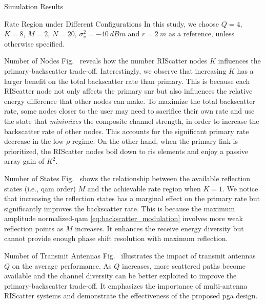 \begin{section}{Simulation Results}
\begin{subsection}{Rate Region under Different Configurations}
		In this study, we choose $Q=4$, $K=8$, $M=2$, $N=20$, $\sigma_v^2=\qty{-40}{dBm}$ and $r=\qty{2}{m}$ as a reference, unless otherwise specified.
		\begin{subsubsection}{Number of Nodes}
			Fig.~ reveals how the number RIScatter nodes $K$ influences the primary-backscatter trade-off.
			Interestingly, we observe that increasing $K$ has a larger benefit on the total backscatter rate than primary.
			This is because each RIScatter node not only affects the primary \gls{snr} but also influences the relative energy difference that other nodes can make.
			To maximize the total backscatter rate, some nodes closer to the user may need to sacrifice their own rate and use the state that \emph{minimizes} the composite channel strength, in order to increase the backscatter rate of other nodes.
			This accounts for the significant primary rate decrease in the low-$\rho$ regime.
			On the other hand, when the primary link is prioritized, the RIScatter nodes boil down to \gls{ris} elements and enjoy a passive array gain of $K^2$.
		\end{subsubsection}

		\begin{subsubsection}{Number of States}
			Fig.~ shows the relationship between the available reflection states (i.e., \gls{qam} order) $M$ and the achievable rate region when $K=1$.
			We notice that increasing the reflection states has a marginal effect on the primary rate but significantly improves the backscatter rate.
			This is because the maximum amplitude normalized-\gls{qam} \eqref{eq:backscatter_modulation} involves more weak reflection points as $M$ increases.
			It enhances the receive energy diversity but cannot provide enough phase shift resolution with maximum reflection.
		\end{subsubsection}

		\begin{subsubsection}{Number of Transmit Antennas}
			Fig.~ illustrates the impact of transmit antennas $Q$ on the average performance.
			As $Q$ increases, more scattered paths become available and the channel diversity can be better exploited to improve the primary-backscatter trade-off.
			It emphasizes the importance of multi-antenna RIScatter systems and demonstrate the effectiveness of the proposed \gls{pga} design.
		\end{subsubsection}


\end{subsection}
\end{section}
